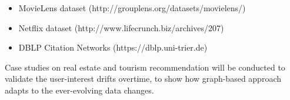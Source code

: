 \begin{itemize}

\item MovieLens dataset (http://grouplens.org/datasets/movielens/) 

\item Netflix dataset (http://www.lifecrunch.biz/archives/207) 

\item DBLP Citation Networks (https://dblp.uni-trier.de)  

\end{itemize}

Case studies on real estate and tourism recommendation will be conducted to validate the user-interest drifts overtime, to show how graph-based approach adapts to the ever-evolving data changes. 
